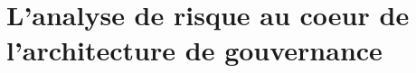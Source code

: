 \section{L'analyse de risque au coeur de l'architecture de gouvernance}


\utodo


%
%
%
%
%
%
%
%
%
%

